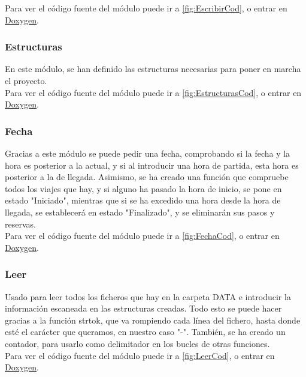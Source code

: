 Para ver el código fuente del módulo puede ir a \ref{fig:EscribirCod}, o entrar en \href{DOC_DOXYGEN/escribir_8h_source.html}{Doxygen}.
\label{fig:Escribir}

\subsubsection{Estructuras}

En este módulo, se han definido las estructuras necesarias para poner en marcha el proyecto.\\

Para ver el código fuente del módulo puede ir a \ref{fig:EstructurasCod}, o entrar en \href{DOC_DOXYGEN/annotated.html}{Doxygen}.

\label{fig:Estructuras}

\subsubsection{Fecha}

Gracias a este módulo se puede pedir una fecha, comprobando si la fecha y la hora es posterior a la actual, y si al introducir una hora de partida,
esta hora es posterior a la de llegada. Asimismo, se ha creado una función que compruebe todos los viajes que hay, y si alguno ha pasado la hora de inicio, se pone en estado "Iniciado",
mientras que si se ha excedido una hora desde la hora de llegada, se establecerá en estado "Finalizado", y se eliminarán sus pasos y reservas.\\

Para ver el código fuente del módulo puede ir a \ref{fig:FechaCod}, o entrar en \href{DOC_DOXYGEN/fecha_8h_source.html}{Doxygen}.
\label{fig:Fecha}

\subsubsection{Leer}

Usado para leer todos los ficheros que hay en la carpeta DATA e introducir la información escaneada en las estructuras creadas. Todo esto se puede hacer gracias a la función strtok,
que va rompiendo cada línea del fichero, hasta donde esté el carácter que queramos, en nuestro caso "-".
También, se ha creado un contador, para usarlo como delimitador en los bucles de otras funciones.\\

Para ver el código fuente del módulo puede ir a \ref{fig:LeerCod}, o entrar en \href{DOC_DOXYGEN/leer_8h_source.html}{Doxygen}.
\label{fig:Leer}


